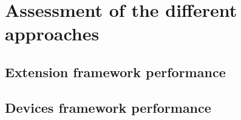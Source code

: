 \section{Assessment of the different approaches}

\subsection{Extension framework performance}

\subsection{Devices framework performance}